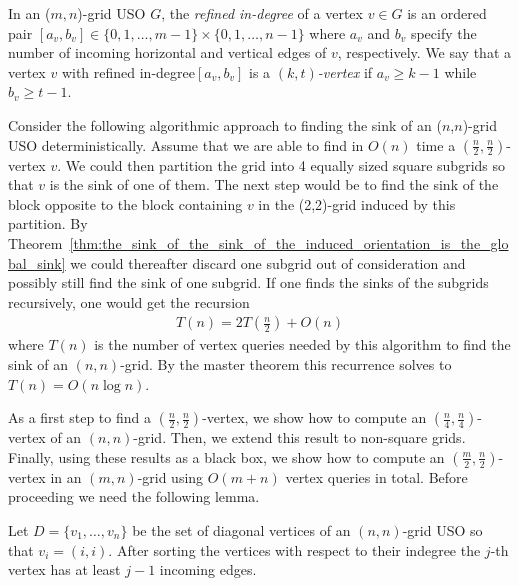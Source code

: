 \documentclass[runningheads,a4paper]{llncs}
\newcommand{\indegree}{refined in-degree\xspace}
\begin{document}
In an ($m,n$)-grid USO $G$, the \emph{\indegree} of a vertex $v \in G$ is an ordered pair $[a_v, b_v] \in \{0,1,\ldots,m-1\}\times \{0,1,\ldots,n-1\}$ where $a_v$ and $b_v$ specify the number of incoming horizontal  and vertical edges of $v$, respectively.
We say that a vertex $v$ with \indegree $[a_v, b_v]$ is a \emph{$(k, t)$-vertex} if $a_v\geq k-1$ while $b_v\geq t-1$.

Consider the following algorithmic approach to finding the sink of an ($n$,$n$)-grid USO deterministically. 
Assume that we are able to find in $O(n)$ time a $(\frac{n}{2}, \frac{n}{2})$-vertex $v$.
We could then partition the grid into 4 equally sized square subgrids so that $v$ is the sink of one of them.
The next step would be to find the sink of the block opposite to the block containing $v$ in the (2,2)-grid induced by this partition. 
By Theorem~\ref{thm:the_sink_of_the_sink_of_the_induced_orientation_is_the_global_sink} we could thereafter discard one subgrid out of consideration and possibly still find the sink of one subgrid.
If one finds the sinks of the subgrids recursively, one would get the recursion
\begin{align*}
 T(n) = 2T\left(\frac{n}{2}\right) + O(n)
\end{align*}
where $T(n)$ is the number of vertex queries needed by this algorithm to find the sink of an $(n,n)$-grid. By the master theorem this recurrence solves to $T(n) = O(n\log n)$. 

As a first step to find a $(\frac{n}{2}, \frac{n}{2})$-vertex, we show how to compute an $(\frac{n}{4}, \frac{n}{4})$-vertex of an $(n, n)$-grid. Then, we extend this result to non-square grids. Finally, using these results as a black box, we show how to compute an $(\frac{m}{2}, \frac{n}{2})$-vertex in an $(m,n)$-grid using $O(m+n)$ vertex queries in total. 
Before proceeding we need the following lemma.

\begin{lemma}
\label{lem:diagonal_lemma}
Let $D = \{v_1,\ldots,v_n\}$ be the set of diagonal vertices of an $(n,n)$-grid USO so that $v_i = (i,i)$. After sorting the vertices with respect to their indegree the $j$-th vertex has at least $j-1$ incoming edges.
\end{lemma}
\end{document}
